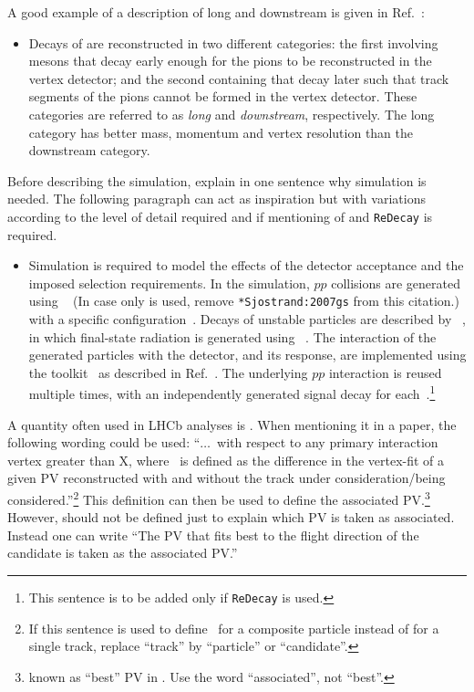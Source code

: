A good example of a description of long and downstream \KS is given in 
Ref.~\cite{LHCb-PAPER-2014-006}:
\begin{itemize}
\item
Decays of \decay{\KS}{\pip\pim} are reconstructed in two different categories:
the first involving \KS mesons that decay early enough for the
pions to be reconstructed in the vertex detector; and the
second containing \KS that decay later such that track segments of the
pions cannot be formed in the vertex detector. These categories are
referred to as \emph{long} and \emph{downstream}, respectively. The
long category has better mass, momentum and vertex resolution than the
downstream category.
\end{itemize}

Before describing the simulation, explain in one sentence why simulation is needed.
The following paragraph can act as inspiration but
with variations according to the level of detail required and if
mentioning of \eg \photos and {\tt ReDecay} is required.
\begin{itemize}
\item Simulation is required to model the effects of the detector acceptance and the
  imposed selection requirements.
  In the simulation, $pp$ collisions are generated using
  \pythia~\cite{Sjostrand:2007gs,*Sjostrand:2006za} 
  (In case only  is used, remove \verb=*Sjostrand:2007gs= from this citation.)
  with a specific \lhcb configuration~\cite{LHCb-PROC-2010-056}.
  Decays of unstable particles
  are described by \evtgen~\cite{Lange:2001uf}, in which final-state
  radiation is generated using \photos~\cite{davidson2015photos}.
  The interaction of the generated particles with the detector, and its response,
  are implemented using the \geant
  toolkit~\cite{Allison:2006ve, *Agostinelli:2002hh} as described in
  Ref.~\cite{LHCb-PROC-2011-006}. 
  The underlying $pp$ interaction is reused multiple times, with an independently generated signal decay for each~\cite{LHCb-DP-2018-004}.\footnote{This sentence is to be added only if {\tt ReDecay} is used.}
\end{itemize}

A quantity often used in LHCb analyses is \chisqip. When mentioning it in 
a paper, the following wording could be used: ``$\ldots$\chisqip\ with respect 
to any primary interaction vertex greater than X, where \chisqip\ is defined as 
the difference in the vertex-fit \chisq of a given PV reconstructed with and
without the track under consideration/being considered.''\footnote{If this
sentence is used to define \chisqip\ for a composite particle instead of 
for a single track, replace ``track'' by ``particle'' or ``candidate''.}
This definition can then be used to define the associated PV.\footnote{known as ``best'' PV in \davinci. Use the word ``associated'', not ``best''.} However,
  \chisqip should not be defined just to explain which PV is taken as associated. Instead one can write ``The PV that fits best to the flight direction of the \B candidate is taken as the associated PV.''
  
